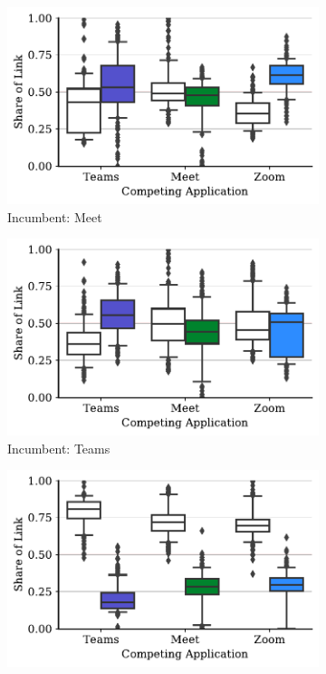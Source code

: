 \begin{figure}[t!]
    \centering
    \begin{subfigure}[t]{.33\textwidth}
        \centering
        \includegraphics[width=1\textwidth]{figures/comp/box_plot_meet_ul_0.5_all.pdf}
        \caption{Incumbent: Meet}
        \label{fig:meet_ul_box}
    \end{subfigure}\hfill
    \begin{subfigure}[t]{.33\textwidth}
        \centering
        \includegraphics[width=1\textwidth]{figures/comp/box_plot_teams_ul_0.5_all.pdf}
        \caption{Incumbent: Teams}
        \label{subfig:teams_ul_box}
    \end{subfigure}
    \begin{subfigure}[t]{.33\textwidth}
        \centering
        \includegraphics[width=1\textwidth]{figures/comp/box_plot_zoom_ul_0.5_all.pdf}

\end{subfigure}
\end{figure}
